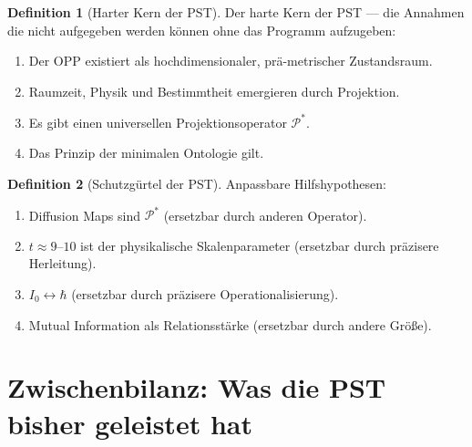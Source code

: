 \documentclass[11pt,a4paper]{article}
\theoremstyle{plain}
\theoremstyle{definition}
\newtheorem{definition}{Definition}[section]
\newcommand{\Proj}{\mathcal{P}}
\begin{document}
\begin{definition}[Harter Kern der PST]
Der harte Kern der PST --- die Annahmen die nicht aufgegeben werden
k\"{o}nnen ohne das Programm aufzugeben:
\begin{enumerate}
  \item Der OPP existiert als hochdimensionaler, pr\"{a}-metrischer
        Zustandsraum.
  \item Raumzeit, Physik und Bestimmtheit emergieren durch Projektion.
  \item Es gibt einen universellen Projektionsoperator $\Proj^\ast$.
  \item Das Prinzip der minimalen Ontologie gilt.
\end{enumerate}
\end{definition}

\begin{definition}[Schutzg\"{u}rtel der PST]
Anpassbare Hilfshypothesen:
\begin{enumerate}
  \item Diffusion Maps sind $\Proj^\ast$ (ersetzbar durch anderen Operator).
  \item $t \approx 9$--$10$ ist der physikalische Skalenparameter
        (ersetzbar durch pr\"{a}zisere Herleitung).
  \item $I_0 \leftrightarrow \hbar$ (ersetzbar durch pr\"{a}zisere
        Operationalisierung).
  \item Mutual Information als Relationsst\"{a}rke (ersetzbar durch
        andere Gr\"{o}\ss{}e).
\end{enumerate}
\end{definition}

\section{Zwischenbilanz: Was die PST bisher geleistet hat}
\end{document}

